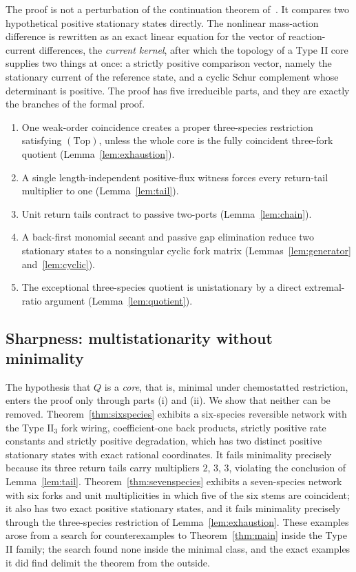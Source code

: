 \documentclass[11pt,reqno]{amsart}
\theoremstyle{plain}
\theoremstyle{definition}
\theoremstyle{remark}
\numberwithin{equation}{section}
\newcommand{\Top}{\mathrm{(Top)}}
\begin{document}
The proof is not a perturbation of the continuation theorem of~\cite{NNU26}.  It compares two hypothetical positive stationary states directly.  The nonlinear mass-action difference is rewritten as an exact linear equation for the vector of reaction-current differences, the \emph{current kernel}, after which the topology of a Type II core supplies two things at once: a strictly positive comparison vector, namely the stationary current of the reference state, and a cyclic Schur complement whose determinant is positive.  The proof has five irreducible parts, and they are exactly the branches of the formal proof.
\begin{enumerate}[label=(\roman*)]
\item One weak-order coincidence creates a proper three-species restriction satisfying $\Top$, unless the whole core is the fully coincident three-fork quotient (Lemma~\ref{lem:exhaustion}).
\item A single length-independent positive-flux witness forces every return-tail multiplier to one (Lemma~\ref{lem:tail}).
\item Unit return tails contract to passive two-ports (Lemma~\ref{lem:chain}).
\item A back-first monomial secant and passive gap elimination reduce two stationary states to a nonsingular cyclic fork matrix (Lemmas~\ref{lem:generator} and~\ref{lem:cyclic}).
\item The exceptional three-species quotient is unistationary by a direct extremal-ratio argument (Lemma~\ref{lem:quotient}).
\end{enumerate}

\subsection*{Sharpness: multistationarity without minimality}
The hypothesis that $Q$ is a \emph{core}, that is, minimal under chemostatted restriction, enters the proof only through parts (i) and (ii).  We show that neither can be removed.  Theorem~\ref{thm:sixspecies} exhibits a six-species reversible network with the Type $\mathrm{II}_3$ fork wiring, coefficient-one back products, strictly positive rate constants and strictly positive degradation, which has two distinct positive stationary states with exact rational coordinates.  It fails minimality precisely because its three return tails carry multipliers $2$, $3$, $3$, violating the conclusion of Lemma~\ref{lem:tail}.  Theorem~\ref{thm:sevenspecies} exhibits a seven-species network with six forks and unit multiplicities in which five of the six stems are coincident; it also has two exact positive stationary states, and it fails minimality precisely through the three-species restriction of Lemma~\ref{lem:exhaustion}.  These examples arose from a search for counterexamples to Theorem~\ref{thm:main} inside the Type II family; the search found none inside the minimal class, and the exact examples it did find delimit the theorem from the outside.
\end{document}
